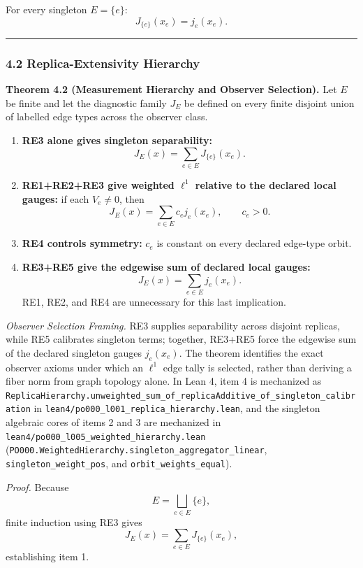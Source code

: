 \documentclass[
  11pt,
]{article}
\providecommand{\tightlist}{%
  \setlength{\itemsep}{0pt}\setlength{\parskip}{0pt}}
\providecommand{\tightlist}{%
  \setlength{\itemsep}{0pt}\setlength{\parskip}{0pt}}
\begin{document}
For every singleton \(E=\{e\}\):
\[ J_{\{e\}}(x_e)=j_e(x_e). \]

\begin{center}\rule{0.5\linewidth}{0.5pt}\end{center}

\subsubsection{4.2 Replica-Extensivity Hierarchy}\label{replica-extensivity-hierarchy}

\textbf{Theorem 4.2 (Measurement Hierarchy and Observer Selection).} Let \(E\) be finite and let the diagnostic family \(J_E\) be defined on every finite disjoint union of labelled edge types across the observer class.

\begin{enumerate}
\def\labelenumi{\arabic{enumi}.}
\tightlist
\item
  \textbf{RE3 alone gives singleton separability:}
  \[
  J_E(x)=\sum_{e\in E}J_{\{e\}}(x_e).
  \]
\item
  \textbf{RE1+RE2+RE3 give weighted \(\ell^1\) relative to the declared local gauges:} if each \(V_e\ne0\), then
  \[
  J_E(x)=\sum_{e\in E}c_ej_e(x_e),\qquad c_e>0.
  \]
\item
  \textbf{RE4 controls symmetry:} \(c_e\) is constant on every declared edge-type orbit.
\item
  \textbf{RE3+RE5 give the edgewise sum of declared local gauges:}
  \[
  J_E(x)=\sum_{e\in E}j_e(x_e).
  \]
  RE1, RE2, and RE4 are unnecessary for this last implication.
\end{enumerate}

\emph{Observer Selection Framing.} RE3 supplies separability across disjoint replicas, while RE5 calibrates singleton terms; together, RE3+RE5 force the edgewise sum of the declared singleton gauges \(j_e(x_e)\). The theorem identifies the exact observer axioms under which an \(\ell^1\) edge tally is selected, rather than deriving a fiber norm from graph topology alone. In Lean 4, item 4 is mechanized as \texttt{ReplicaHierarchy.unweighted\_sum\_of\_replicaAdditive\_of\_singleton\_calibration} in \texttt{lean4/po000\_l001\_replica\_hierarchy.lean}, and the singleton algebraic cores of items 2 and 3 are mechanized in \texttt{lean4/po000\_l005\_weighted\_hierarchy.lean} (\texttt{PO000.WeightedHierarchy.singleton\_aggregator\_linear}, \texttt{singleton\_weight\_pos}, and \texttt{orbit\_weights\_equal}).

\emph{Proof.} Because
\[
E=\bigsqcup_{e\in E}\{e\},
\]
finite induction using RE3 gives
\[
J_E(x)=\sum_{e\in E}J_{\{e\}}(x_e),
\]
establishing item 1.
\end{document}
